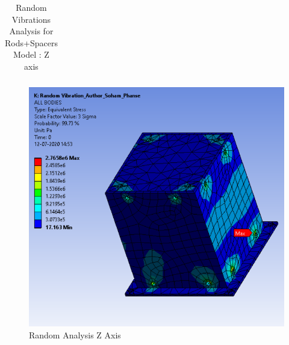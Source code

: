 \documentclass[../../main.tex]{subfiles}
\begin{document}
\begin{enumerate}
\begin{enumerate}
\begin{enumerate}
\begin{enumerate}
\begin{table}[h!]
\begin{tabular}{|p{8cm}|p{3cm}|}
                        \hline
                    \end{tabular}
                    \caption{Random Vibrations Analysis for Rods+Spacers Model : Z axis}
                    \label{tab:my_label}
                \end{table}
                \begin{figure}[H]
                    \centering
                    \includegraphics[scale=0.75]{Figures/Mechanical/spacer-rand-Z.PNG}
                    \caption{Random Analysis Z Axis}
                    \label{fig:sys_CAD}
                \end{figure}
                \end{enumerate} 
            \end{enumerate}
        \end{enumerate}
        

\end{enumerate}
\end{document}
